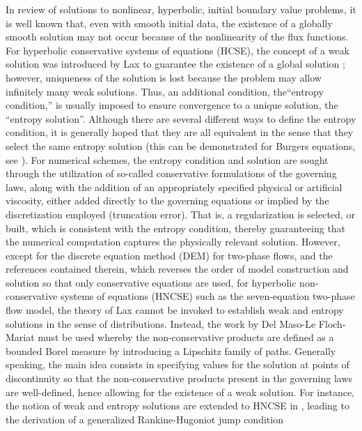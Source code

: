 In review of solutions to nonlinear, hyperbolic, initial boundary value problems, it is well known that, even with smooth initial data, 
the existence of a globally smooth solution may not occur because of the nonlinearity of the flux functions. For hyperbolic conservative systems 
of equations (HCSE), the concept of a weak solution was introduced by Lax to guarantee the existence of a global solution \cite{Lax}; 
however, uniqueness of the solution is lost because the problem may allow infinitely many weak solutions. Thus, an additional condition, 
the``entropy condition,'' is usually imposed to ensure convergence to a unique solution, the ``entropy solution''.
Although there are several different ways to define the entropy condition, it is generally hoped that they are all equivalent in the sense 
that they select the same entropy solution (this can be demonstrated for Burgers equations, see \cite{Evans1998,Lellis_minimalentropy}).
For numerical schemes, the entropy condition and solution are sought through the utilization of so-called conservative formulations of the 
governing laws, along with the addition of an appropriately specified physical or artificial viscosity, either added directly to the governing 
equations or implied by the discretization employed (truncation error). That is, a regularization is selected, or built, which is consistent with the 
entropy condition, thereby guaranteeing that the numerical computation captures the physically relevant solution. However, 
except for the discrete equation method (DEM) for two-phase flows, \cite{SEM} and the references contained therein, which reverses the order of 
model construction and solution so that only conservative equations are used, for hyperbolic non-conservative systems of equations (HNCSE) such 
as the seven-equation two-phase flow model, the theory of Lax cannot be invoked to establish weak and entropy solutions in the sense of distributions. 
Instead, the work by Del Maso-Le Floch-Mariat \cite{dlm} must be used
whereby the non-conservative products are defined as a bounded Borel measure by introducing a Lipschitz family of paths.
Generally speaking, the main idea consists in specifying values for the solution at points of discontinuity so that the non-conservative products
present in the governing laws are well-defined, hence allowing for the existence of a weak solution. For instance, the notion of weak and entropy solutions 
are extended to HNCSE in \cite{lefloch_1988,lefloch_1989}, leading to the derivation of a generalized Rankine-Hugoniot jump condition
